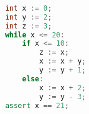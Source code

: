 \begin{lstlisting}[language=C++, style=withAssert]  % Start your code-block
	
	int x := 0;
	int y := 2;
	int z := 3;
	while x <= 20:
		if x <= 10:
			z := x;
			x := x + y;
			y := y + 1;
		else:
			x := x + 2;
			y := y - 3;
	assert x == 21;
	\end{lstlisting}